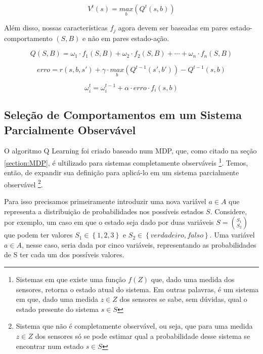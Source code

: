 \begin{equation}
    V^t \left( s \right) = \underset{b}{max} \left( Q^t \left( s, b \right) \right)
\end{equation}

Além disso, nossas características $ f_j $ agora devem ser baseadas em pares estado-comportamento $ \left( S, B \right) $ e não em pares estado-ação.

\begin{equation}
	Q \left( S, B \right) = \omega_1 \cdot f_1 \left( S, B \right) + \omega_2 \cdot f_2 \left( S, B \right) + \cdots + \omega_n \cdot f_n \left( S, B \right)
\end{equation}

\begin{equation} \label{equation:QErrorBehavior}
	erro = r \left( s, b, s' \right) + \gamma \cdot \underset{b}{max} \left( Q^{t-1} \left( s', b' \right) \right) - Q^{t-1} \left( s, b \right)
\end{equation}

\begin{equation} \label{equation:OmegaUpdateBehavior}
	\omega_i^t = \omega_i^{t-1} + \alpha \cdot erro \cdot f_i \left( s, b \right)
\end{equation}


\subsection{Seleção de Comportamentos em um Sistema Parcialmente Observável} \label{subsection:QLearningParcialmenteObservavel}

O algoritmo Q Learning foi criado baseado num MDP, que, como citado na seção \ref{section:MDP}, é ultilizado para sistemas completamente observáveis%
\footnote{Sistemas em que existe uma função $ f \left( Z \right) $ que, dado uma medida dos sensores, retorna o estado atual do sistema. Em outras palavras, é um sistema em que, dado uma medida $ z \in Z $ dos sensores se sabe, sem dúvidas, qual o estado presente do sistema $ s \in S $%
}. Temos, então, de expandir sua definição para aplicá-lo em um sistema parcialmente observável%
\footnote{Sistema que não é completamente observável, ou seja, que para uma medida $ z \in Z $ dos sensores só se pode estimar qual a probabilidade desse sistema se encontrar num estado $ s \in S $%
}.

Para isso precisamos primeiramente introduzir uma nova variável $ a \in A $ que representa a distribuição de probabilidades nos possíveis estados $ S $. Considere, por exemplo, um caso em que o estado seja dado por duas variáveis $ S = \binom{S_1}{S_2} $ que podem ter valores $ S_1 \in \left\{1,2,3\right\} $ e $ S_2 \in \left\{verdadeiro, falso\right\} $. Uma variável $ a \in A $, nesse caso, seria dada por cinco variáveis, representando as probabilidades de S ter cada um dos possíveis valores.

